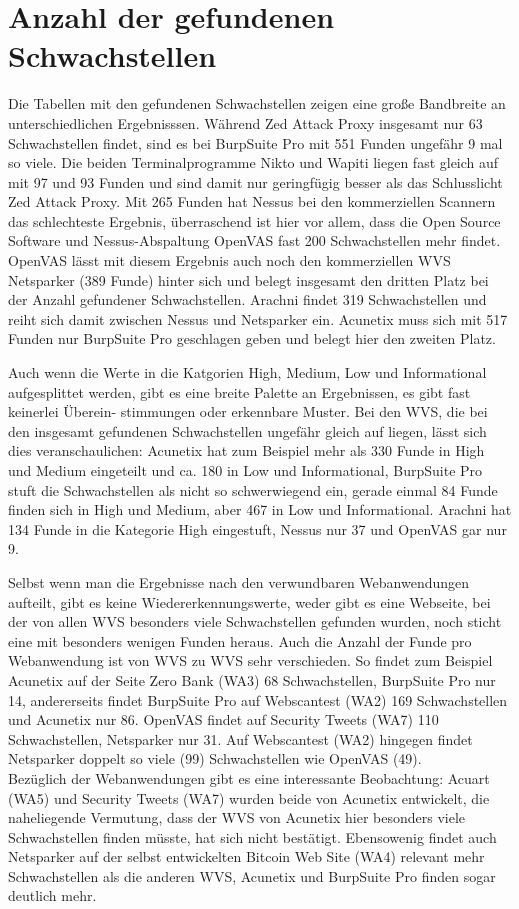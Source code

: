 \documentclass[12pt,oneside,a4paper,parskip]{scrbook}
\begin{document}
  \section{Anzahl der gefundenen Schwachstellen}
  Die Tabellen mit den gefundenen Schwachstellen zeigen eine große Bandbreite an unterschiedlichen Ergebnisssen. Während Zed Attack Proxy insgesamt nur 63 Schwachstellen findet, sind es bei BurpSuite Pro mit 551 Funden ungefähr 9 mal so viele. Die beiden Terminalprogramme Nikto und Wapiti liegen fast gleich auf mit 97 und 93 Funden und sind damit nur geringfügig besser als das Schlusslicht Zed Attack Proxy.
  Mit 265 Funden hat Nessus bei den kommerziellen Scannern das schlechteste Ergebnis, überraschend ist hier vor allem, dass die Open Source Software und Nessus-Abspaltung OpenVAS fast 200 Schwachstellen mehr findet.
  OpenVAS lässt mit diesem Ergebnis auch noch den kommerziellen WVS Netsparker (389 Funde) hinter sich und belegt insgesamt den dritten Platz bei der Anzahl gefundener Schwachstellen. Arachni findet 319 Schwachstellen und reiht sich damit zwischen Nessus und Netsparker ein. Acunetix muss sich mit 517 Funden nur BurpSuite Pro geschlagen geben und belegt hier den zweiten Platz.

  Auch wenn die Werte in die Katgorien High, Medium, Low und Informational aufgesplittet werden, gibt es eine breite Palette an Ergebnissen, es gibt fast keinerlei Überein- stimmungen oder erkennbare Muster. Bei den WVS, die bei den insgesamt gefundenen Schwachstellen ungefähr gleich auf liegen, lässt sich dies veranschaulichen: Acunetix hat zum Beispiel mehr als 330 Funde in High und Medium eingeteilt und ca. 180 in Low und Informational, BurpSuite Pro stuft die Schwachstellen als nicht so schwerwiegend ein,  gerade einmal 84 Funde finden sich in High und Medium, aber 467 in Low und Informational. Arachni hat 134 Funde in die Kategorie High eingestuft, Nessus nur 37 und OpenVAS gar nur 9.

  Selbst wenn man die Ergebnisse nach den verwundbaren Webanwendungen aufteilt, gibt es keine Wiedererkennungswerte, weder gibt es eine Webseite, bei der von allen WVS besonders viele Schwachstellen gefunden wurden, noch sticht eine mit besonders wenigen Funden heraus. Auch die Anzahl der Funde pro Webanwendung ist von WVS zu WVS sehr verschieden. So findet zum Beispiel Acunetix auf der Seite Zero Bank (WA3) 68 Schwachstellen, BurpSuite Pro nur 14, andererseits findet BurpSuite Pro auf Webscantest (WA2) 169 Schwachstellen und Acunetix nur 86. OpenVAS findet auf Security Tweets (WA7) 110 Schwachstellen, Netsparker nur 31. Auf Webscantest (WA2) hingegen findet Netsparker doppelt so viele (99) Schwachstellen wie OpenVAS (49).\\
  Bezüglich der Webanwendungen gibt es eine interessante Beobachtung:  Acuart (WA5) und Security Tweets (WA7) wurden beide von Acunetix entwickelt, die naheliegende Vermutung, dass der WVS von Acunetix hier besonders viele Schwachstellen finden müsste, hat sich nicht bestätigt.
  Ebensowenig findet auch Netsparker auf der selbst entwickelten Bitcoin Web Site (WA4) relevant mehr Schwachstellen als die anderen WVS, Acunetix und BurpSuite Pro finden sogar deutlich mehr.
\end{document}
